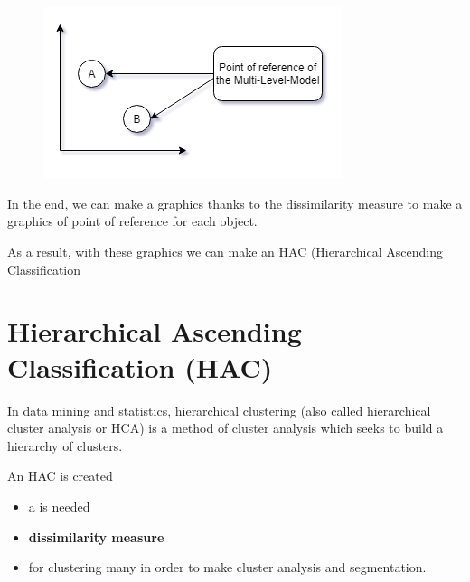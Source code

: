 \documentclass[12pt]{report}
\begin{document}
\begin{multicols}{2}


\begin{figure}[H]
	\begin{Center}
		\includegraphics[width=247.6pt,height=141.95pt]{./media/image16.png}
	\end{Center}
\end{figure}



In the end, we can make a graphics thanks to the dissimilarity measure to make a graphics of point of reference for each object. \par
As a result, with these graphics we can make an HAC (Hierarchical Ascending Classification

\end{multicols}


\newpage

\vspace{\baselineskip}\section*{Hierarchical Ascending Classification (HAC)}
In data mining and statistics, hierarchical clustering (also called hierarchical cluster analysis or HCA) is a method of cluster analysis which seeks to build a hierarchy of clusters. \par

An HAC is created  \par

\begin{itemize}
	\item a  is needed\par

	\item \textbf{dissimilarity  measure }\par

	\item for clustering many  in order to make cluster analysis and segmentation.
\end{itemize}\par
\end{document}
